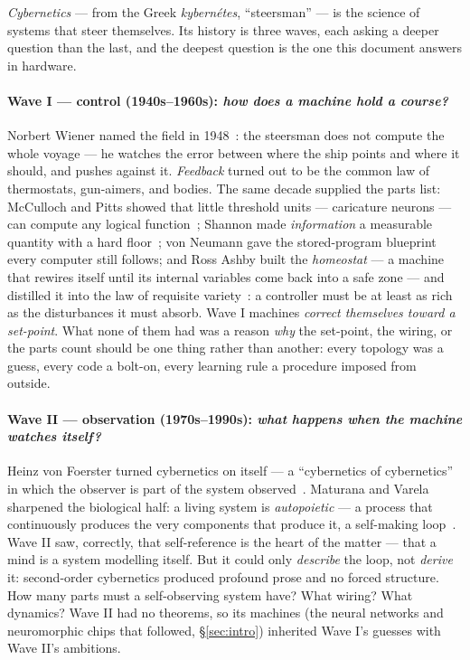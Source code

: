 \emph{Cybernetics} --- from the Greek \emph{kybern\'etes}, ``steersman'' ---
is the science of systems that steer themselves. Its history is three waves,
each asking a deeper question than the last, and the deepest question is the
one this document answers in hardware.

\paragraph{Wave I --- control (1940s--1960s): \emph{how does a machine hold a
course?}} Norbert Wiener named the field in 1948~\cite{wiener1948}: the
steersman does not compute the whole voyage --- he watches the error between
where the ship points and where it should, and pushes against it.
\emph{Feedback} turned out to be the common law of thermostats, gun-aimers,
and bodies. The same decade supplied the parts list: McCulloch and Pitts
showed that little threshold units --- caricature neurons --- can compute any
logical function~\cite{mcculloch1943}; Shannon made \emph{information} a
measurable quantity with a hard floor~\cite{shannon1948}; von Neumann gave
the stored-program blueprint every computer still follows; and Ross Ashby
built the \emph{homeostat} --- a machine that rewires itself until its
internal variables come back into a safe zone --- and distilled it into the
law of requisite variety~\cite{ashby1956}: a controller must be at least as
rich as the disturbances it must absorb. Wave I machines \emph{correct
themselves toward a set-point}. What none of them had was a reason \emph{why}
the set-point, the wiring, or the parts count should be one thing rather than
another: every topology was a guess, every code a bolt-on, every learning
rule a procedure imposed from outside.

\paragraph{Wave II --- observation (1970s--1990s): \emph{what happens when the
machine watches itself?}} Heinz von Foerster turned cybernetics on itself ---
a ``cybernetics of cybernetics'' in which the observer is part of the system
observed~\cite{foerster2003}. Maturana and Varela sharpened the biological
half: a living system is \emph{autopoietic} --- a process that continuously
produces the very components that produce it, a self-making
loop~\cite{maturana1980}. Wave II saw, correctly, that self-reference is the
heart of the matter --- that a mind is a system modelling itself. But it
could only \emph{describe} the loop, not \emph{derive} it: second-order
cybernetics produced profound prose and no forced structure. How many parts
must a self-observing system have? What wiring? What dynamics? Wave II had no
theorems, so its machines (the neural networks and neuromorphic chips that
followed, \S\ref{sec:intro}) inherited Wave I's guesses with Wave II's
ambitions.

